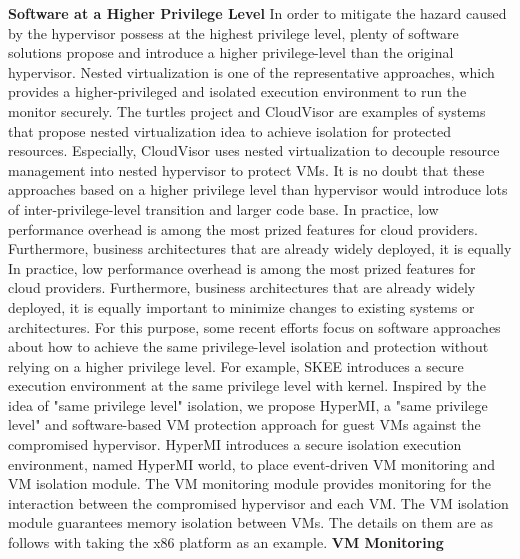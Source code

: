 \documentclass[conference]{IEEEtran}
\begin{document}
\textbf{Software at a Higher Privilege Level}
In order to mitigate the hazard caused by the hypervisor possess at the highest privilege level, plenty of software solutions propose and introduce a higher privilege-level than the original hypervisor. Nested virtualization is one of the representative approaches, which provides a higher-privileged and isolated execution environment to run the monitor securely. The turtles project \cite{Ben2007The} and CloudVisor \cite{Zhang2011CloudVisor} are examples of systems that propose nested virtualization idea to achieve isolation for protected resources. Especially, CloudVisor uses nested virtualization to decouple resource management into nested hypervisor to protect VMs. It is no doubt that these approaches based on a higher privilege level than hypervisor would introduce lots of inter-privilege-level transition and larger code base.
In practice, low performance overhead is among the most prized features for cloud providers. Furthermore, business architectures that are already widely deployed, it is equally In practice, low performance overhead is among the most prized features for cloud providers. Furthermore, business architectures that are already widely deployed, it is equally important to minimize changes to existing systems or architectures. For this purpose,
some recent efforts focus on software approaches about how to achieve the same privilege-level isolation and protection without relying on a higher privilege level. For example, SKEE\cite{Azab2016SKEE} introduces a secure execution environment at the same privilege level with kernel. 
Inspired by the idea of "same privilege level" isolation, we propose HyperMI, a "same privilege level" and software-based VM protection approach for guest VMs against the compromised hypervisor. HyperMI introduces a secure isolation execution environment, named HyperMI world, to place event-driven VM monitoring and VM isolation module. 
The VM monitoring module provides monitoring for the interaction between the compromised hypervisor and each VM. 
The VM isolation module guarantees memory isolation between VMs. The details on them are as follows with taking the x86 platform as an example.
\textbf{VM Monitoring}
\end{document}
